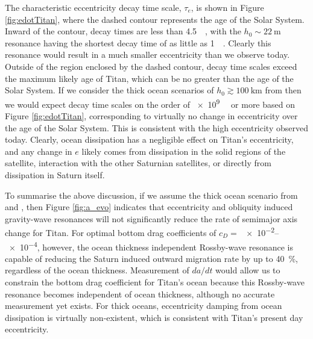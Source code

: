The characteristic eccentricity decay time scale, $\tau_e$, is shown in Figure \ref{fig:edotTitan}, where the dashed contour represents the age of the Solar System. Inward of the contour, decay times are less than \SI{4.5}{\giga\year}, with the $h_0 \sim \SI{22}{\metre}$ resonance having the shortest decay time of as little as \SI{1}{\mega\year}. Clearly this resonance would result in a much smaller eccentricity than we observe today. Outside of the region enclosed by the dashed contour, decay time scales exceed the maximum likely age of Titan, which can be no greater than the age of the Solar System. If we consider the thick ocean scenarios of $h_0 \gtrsim \SI{100}{\kilo\metre}$ from \citet{baland2014titan, sohl2014structural} then we would expect decay time scales on the order of \SI{e9}{\giga\year} or more based on Figure \ref{fig:edotTitan}, corresponding to virtually no change in eccentricity over the age of the Solar System. This is consistent with the high eccentricity observed today. Clearly, ocean dissipation has a negligible effect on Titan's eccentricity, and any change in $e$ likely comes from dissipation in the solid regions of the satellite, interaction with the other Saturnian satellites, or directly from dissipation in Saturn itself. 

To summarise the above discussion, if we assume the thick ocean scenario from \citet{sohl2014structural} and \citet{baland2014titan}, then Figure \ref{fig:a_evo} indicates that eccentricity and obliquity induced gravity-wave resonances will not significantly reduce the rate of semimajor axis change for Titan. For optimal bottom drag coefficients of $c_D = $ \numrange{e-2}{e-4}, however, the ocean thickness independent Rossby-wave resonance is capable of reducing the Saturn induced outward migration rate by up to \SI{40}{\percent}, regardless of the ocean thickness. Measurement of $da/dt$ would allow us to constrain the bottom drag coefficient for Titan's ocean because this Rossby-wave resonance becomes independent of ocean thickness, although no accurate measurement yet exists. For thick oceans, eccentricity damping from ocean dissipation is virtually non-existent, which is consistent with Titan's present day eccentricity.
